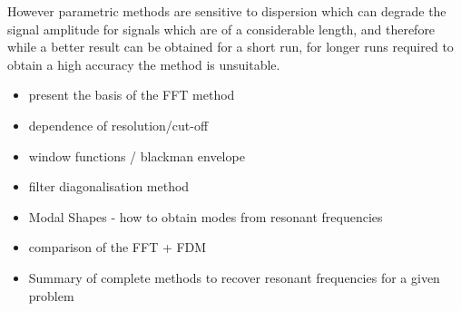 However parametric methods are sensitive to dispersion which can degrade the signal amplitude for signals which are of a considerable length, and therefore while a better result can be obtained for a short run, for longer runs required to obtain a high accuracy the method is unsuitable.

\begin{itemize}
  \item present the basis of the FFT method
  \item dependence of resolution/cut-off
	\item window functions / blackman envelope
	\item filter diagonalisation method
	\item Modal Shapes - how to obtain modes from resonant frequencies
  \item comparison of the FFT + FDM
  \item Summary of complete methods to recover resonant frequencies for a given problem
\end{itemize}

